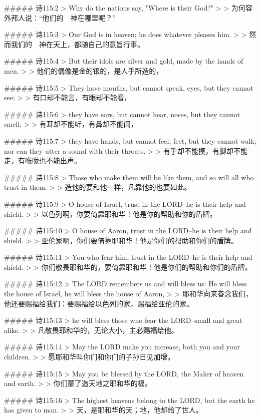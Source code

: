 ##### 诗115:2
> Why do the nations say, "Where is their God?"
>
> 为何容外邦人说：“他们的　神在哪里呢？”


##### 诗115:3
> Our God is in heaven; he does whatever pleases him.
>
> 然而我们的　神在天上，都随自己的意旨行事。


##### 诗115:4
> But their idols are silver and gold, made by the hands of men.
>
> 他们的偶像是金的银的，是人手所造的，


##### 诗115:5
> They have mouths, but cannot speak, eyes, but they cannot see;
>
> 有口却不能言，有眼却不能看，


##### 诗115:6
> they have ears, but cannot hear, noses, but they cannot smell;
>
> 有耳却不能听，有鼻却不能闻，


##### 诗115:7
> they have hands, but cannot feel, feet, but they cannot walk; nor can they utter a sound with their throats.
>
> 有手却不能摸，有脚却不能走，有喉咙也不能出声。


##### 诗115:8
> Those who make them will be like them, and so will all who trust in them.
>
> 造他的要和他一样，凡靠他的也要如此。


##### 诗115:9
> O house of Israel, trust in the LORD--he is their help and shield.
>
> 以色列啊，你要倚靠耶和华！他是你的帮助和你的盾牌。


##### 诗115:10
> O house of Aaron, trust in the LORD--he is their help and shield.
>
> 亚伦家啊，你们要倚靠耶和华！他是你们的帮助和你们的盾牌。


##### 诗115:11
> You who fear him, trust in the LORD--he is their help and shield.
>
> 你们敬畏耶和华的，要倚靠耶和华！他是你们的帮助和你们的盾牌。


##### 诗115:12
> The LORD remembers us and will bless us: He will bless the house of Israel, he will bless the house of Aaron,
>
> 耶和华向来眷念我们，他还要赐福给我们：要赐福给以色列的家，赐福给亚伦的家。


##### 诗115:13
> he will bless those who fear the LORD--small and great alike.
>
> 凡敬畏耶和华的，无论大小，主必赐福给他。


##### 诗115:14
> May the LORD make you increase, both you and your children.
>
> 愿耶和华叫你们和你们的子孙日见加增。


##### 诗115:15
> May you be blessed by the LORD, the Maker of heaven and earth.
>
> 你们蒙了造天地之耶和华的福。


##### 诗115:16
> The highest heavens belong to the LORD, but the earth he has given to man.
>
> 天，是耶和华的天；地，他却给了世人。



